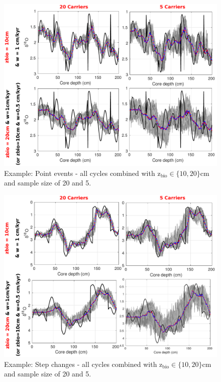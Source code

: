 \documentclass[a4paper,oneside,9pt]{article}
\begin{document}
\begin{figure}[hbp]
\begin{center}
	\includegraphics[width=1.0\textwidth]{../figures/../figures/JustABU_3ycles_combined_pointevents.pdf}
	\caption{Example: Point events - all cycles combined with z$_\mathrm{bio} \in \{10,20 \}$cm and sample size of 20 and 5. }\label{fig:5pointevent}
\end{center}
\end{figure}

\begin{figure}[hbp]
\begin{center}
	\includegraphics[width=1.0\textwidth]{../figures/../figures/JustABU_3ycles_combined_gradual.pdf}
	\caption{Example: Step changes - all cycles combined with z$_\mathrm{bio} \in \{10,20 \}$cm and sample size of 20 and 5. }\label{fig:5pointevent}
\end{center}
\end{figure}
\newpage

\end{document}
